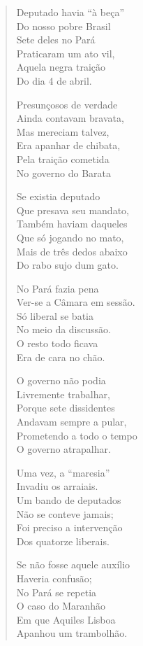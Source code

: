 \begin{verse}
Deputado havia “à beça”\\
Do nosso pobre Brasil\\
Sete deles no Pará\\
Praticaram um ato vil,\\
Aquela negra traição\\
Do dia 4 de abril.

Presunçosos de verdade\\
Ainda contavam bravata,\\
Mas mereciam talvez,\\
Era apanhar de chibata,\\
Pela traição cometida\\
No governo do Barata
\pagebreak

Se existia deputado\\
Que presava seu mandato,\\
Também haviam daqueles\\
Que só jogando no mato,\\
Mais de três dedos abaixo\\
Do rabo sujo dum gato.

No Pará fazia pena\\
Ver-se a Câmara em sessão.\\
Só liberal se batia\\
No meio da discussão.\\
O resto todo ficava\\
Era de cara no chão.

O governo não podia\\
Livremente trabalhar,\\
Porque sete dissidentes\\
Andavam sempre a pular,\\
Prometendo a todo o tempo\\
O governo atrapalhar.

Uma vez, a “maresia”\\
Invadiu os arraiais.\\
Um bando de deputados\\
Não se conteve jamais;\\
Foi preciso a intervenção\\
Dos quatorze liberais.
\pagebreak

Se não fosse aquele auxílio\\
Haveria confusão;\\
No Pará se repetia\\
O caso do Maranhão\\
Em que Aquiles Lisboa\\
Apanhou um trambolhão.


\end{verse}
